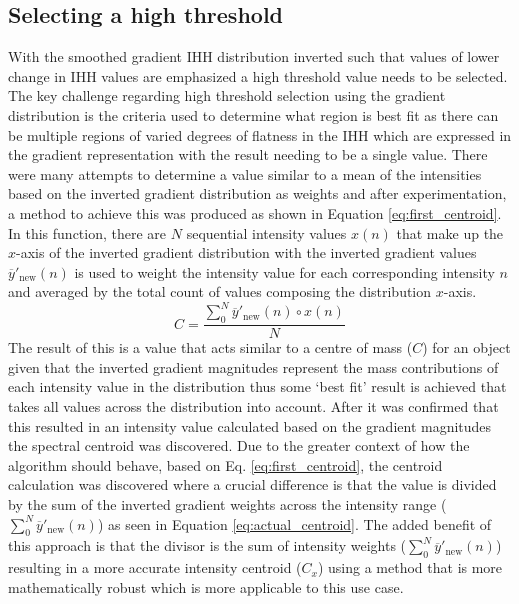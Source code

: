 \subsection{Selecting a high threshold}\label{sec:centroid_calc}
With the smoothed gradient IHH distribution inverted such that values of lower change in IHH values are emphasized a high threshold value needs to be selected. The key challenge regarding high threshold selection using the gradient distribution is the criteria used to determine what region is best fit as there can be multiple regions of varied degrees of flatness in the IHH which are expressed in the gradient representation with the result needing to be a single value. There were many attempts to determine a value similar to a mean of the intensities based on the inverted gradient distribution as weights and after experimentation, a method to achieve this was produced as shown in Equation \ref{eq:first_centroid}. In this function, there are $N$ sequential intensity values $x(n)$ that make up the $x$-axis of the inverted gradient distribution with the inverted gradient values $\overline{y}'_{\text{new}}(n)$ is used to weight the intensity value for each corresponding intensity $n$ and averaged by the total count of values composing the distribution $x$-axis. 
\begin{equation}\label{eq:first_centroid}
    C = \frac{\sum_{0}^{N} \overline{y}'_{\text{new}}(n)\circ x(n)}{N}
\end{equation}
The result of this is a value that acts similar to a centre of mass ($C$) for an object given that the inverted gradient magnitudes represent the mass contributions of each intensity value in the distribution thus some `best fit' result is achieved that takes all values across the distribution into account. After it was confirmed that this resulted in an intensity value calculated based on the gradient magnitudes the spectral centroid was discovered. Due to the greater context of how the algorithm should behave, based on Eq. \ref{eq:first_centroid}, the centroid calculation was discovered where a crucial difference is that the value is divided by the sum of the inverted gradient weights across the intensity range ($\sum_{0}^{N}\overline{y}'_{\text{new}}(n)$) as seen in Equation \ref{eq:actual_centroid}. The added benefit of this approach is that the divisor is the sum of intensity weights ($\sum_{0}^{N}\overline{y}'_{\text{new}}(n)$) resulting in a more accurate intensity centroid ($C_x$) using a method that is more mathematically robust which is more applicable to this use case.

